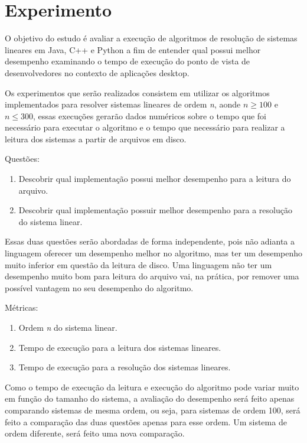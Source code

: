 \documentclass[12pt]{article}
\begin{document}
\section{Experimento}

O objetivo do estudo é avaliar a execução de algoritmos de resolução de sistemas lineares em Java, C++ e Python a fim de entender qual possui melhor desempenho examinando o tempo de execução do ponto de vista de desenvolvedores no contexto de aplicações desktop.

Os experimentos que serão realizados consistem em utilizar os algoritmos implementados para resolver sistemas lineares de ordem \textit{n}, aonde $n \geq 100$ e $n \leq 300$, essas execuções gerarão dados numéricos sobre o tempo que foi necessário para executar o algoritmo e o tempo que necessário para realizar a leitura dos sistemas a partir de arquivos em disco.

Questões:
\begin{enumerate}
    \item Descobrir qual implementação possui melhor desempenho para a leitura do arquivo.
    \item Descobrir qual implementação possuir melhor desempenho para a resolução do sistema linear.
\end{enumerate}

Essas duas questões serão abordadas de forma independente, pois não adianta a linguagem oferecer um desempenho melhor no algoritmo, mas ter um desempenho muito inferior em questão da leitura de disco. Uma linguagem não ter um desempenho  muito bom para leitura do arquivo vai, na prática, por remover uma possível vantagem no seu desempenho do algoritmo.

Métricas:
\begin{enumerate}
    \item Ordem \textit{n} do sistema linear.
    \item Tempo de execução para a leitura dos sistemas lineares.
    \item Tempo de execução para a resolução dos sistemas lineares.
\end{enumerate}

Como o tempo de execução da leitura e execução do algoritmo pode variar muito em função do tamanho do sistema, a avaliação do desempenho será feito apenas comparando sistemas de mesma ordem, ou seja, para sistemas de ordem 100, será feito a comparação das duas questões apenas para esse ordem. Um sistema de ordem diferente, será feito uma nova comparação.
\end{document}
